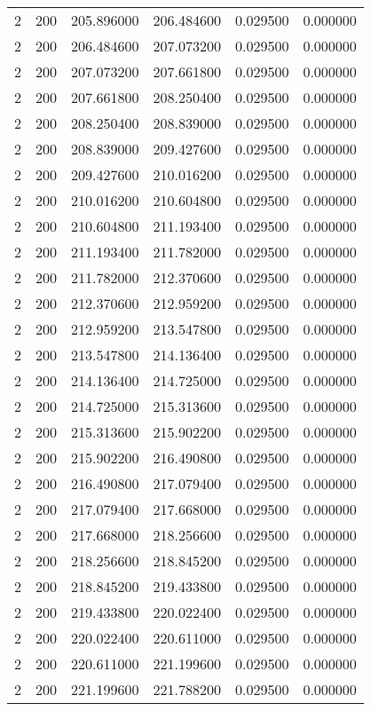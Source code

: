 \begin{longtable}{rrrrrr}
2 & 200 & 205.896000 & 206.484600 & 0.029500 & 0.000000 \\
2 & 200 & 206.484600 & 207.073200 & 0.029500 & 0.000000 \\
2 & 200 & 207.073200 & 207.661800 & 0.029500 & 0.000000 \\
2 & 200 & 207.661800 & 208.250400 & 0.029500 & 0.000000 \\
2 & 200 & 208.250400 & 208.839000 & 0.029500 & 0.000000 \\
2 & 200 & 208.839000 & 209.427600 & 0.029500 & 0.000000 \\
2 & 200 & 209.427600 & 210.016200 & 0.029500 & 0.000000 \\
2 & 200 & 210.016200 & 210.604800 & 0.029500 & 0.000000 \\
2 & 200 & 210.604800 & 211.193400 & 0.029500 & 0.000000 \\
2 & 200 & 211.193400 & 211.782000 & 0.029500 & 0.000000 \\
2 & 200 & 211.782000 & 212.370600 & 0.029500 & 0.000000 \\
2 & 200 & 212.370600 & 212.959200 & 0.029500 & 0.000000 \\
2 & 200 & 212.959200 & 213.547800 & 0.029500 & 0.000000 \\
2 & 200 & 213.547800 & 214.136400 & 0.029500 & 0.000000 \\
2 & 200 & 214.136400 & 214.725000 & 0.029500 & 0.000000 \\
2 & 200 & 214.725000 & 215.313600 & 0.029500 & 0.000000 \\
2 & 200 & 215.313600 & 215.902200 & 0.029500 & 0.000000 \\
2 & 200 & 215.902200 & 216.490800 & 0.029500 & 0.000000 \\
2 & 200 & 216.490800 & 217.079400 & 0.029500 & 0.000000 \\
2 & 200 & 217.079400 & 217.668000 & 0.029500 & 0.000000 \\
2 & 200 & 217.668000 & 218.256600 & 0.029500 & 0.000000 \\
2 & 200 & 218.256600 & 218.845200 & 0.029500 & 0.000000 \\
2 & 200 & 218.845200 & 219.433800 & 0.029500 & 0.000000 \\
2 & 200 & 219.433800 & 220.022400 & 0.029500 & 0.000000 \\
2 & 200 & 220.022400 & 220.611000 & 0.029500 & 0.000000 \\
2 & 200 & 220.611000 & 221.199600 & 0.029500 & 0.000000 \\
2 & 200 & 221.199600 & 221.788200 & 0.029500 & 0.000000 \\

\end{longtable}
